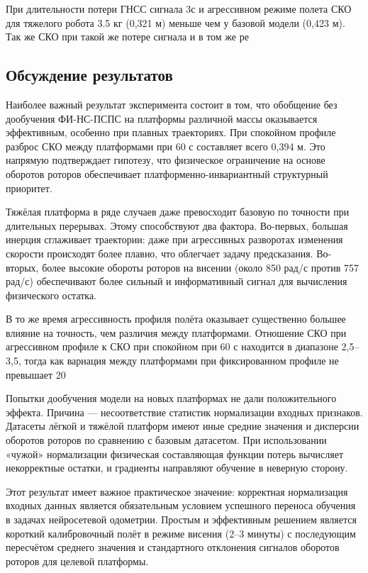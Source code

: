 При длительности потери ГНСС сигнала 3с и агрессивном режиме полета СКО для тяжелого робота 3.5 кг ({0,321} м) меньше чем 
у базовой модели ({0,423} м). Так же СКО при такой же потере сигнала и в том же ре

\subsection{Обсуждение результатов}

Наиболее важный результат эксперимента состоит в том, что обобщение без дообучения ФИ-НС-ПСПС на платформы различной массы оказывается эффективным, особенно при плавных траекториях. При спокойном профиле разброс СКО между платформами при 60 с составляет всего 0,394 м. Это напрямую подтверждает гипотезу, что физическое ограничение на основе оборотов роторов обеспечивает платформенно-инвариантный структурный приоритет.

Тяжёлая платформа в ряде случаев даже превосходит базовую по точности при длительных перерывах. Этому способствуют два фактора. Во-первых, большая инерция сглаживает траектории: даже при агрессивных разворотах изменения скорости происходят более плавно, что облегчает задачу предсказания. Во-вторых, более высокие обороты роторов на висении (около 850 рад/с против 757 рад/с) обеспечивают более сильный и информативный сигнал для вычисления физического остатка.

В то же время агрессивность профиля полёта оказывает существенно большее влияние на точность, чем различия между платформами. Отношение СКО при агрессивном профиле к СКО при спокойном при 60 с находится в диапазоне 2,5--3,5, тогда как вариация между платформами при фиксированном профиле не превышает 20 %

Попытки дообучения модели на новых платформах не дали положительного эффекта. Причина — несоответствие статистик нормализации входных признаков. Датасеты лёгкой и тяжёлой платформ имеют иные средние значения и дисперсии оборотов роторов по сравнению с базовым датасетом. При использовании «чужой» нормализации физическая составляющая функции потерь вычисляет некорректные остатки, и градиенты направляют обучение в неверную сторону. 

Этот результат имеет важное практическое значение: корректная нормализация входных данных является обязательным условием успешного переноса обучения в задачах нейросетевой одометрии. Простым и эффективным решением является короткий калибровочный полёт в режиме висения (2--3 минуты) с последующим пересчётом среднего значения и стандартного отклонения сигналов оборотов роторов для целевой платформы.

